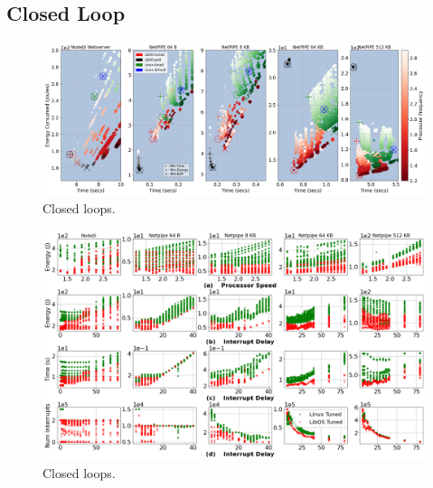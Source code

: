 \subsection{Closed Loop}
\label{sec:closed_loop}
\begin{figure}
\centering
\includegraphics[width=1\textwidth]{figures/closed_loop_overview.png}
\caption[]
{Closed loops.}
\label{fig:closed_loop_overview}
\end{figure}
\begin{figure}
\centering
\includegraphics[width=1\textwidth]{figures/closed_detail_1.png}
\caption[]
{Closed loops.}
\label{fig:closed_loop_detail_1}
\end{figure}
